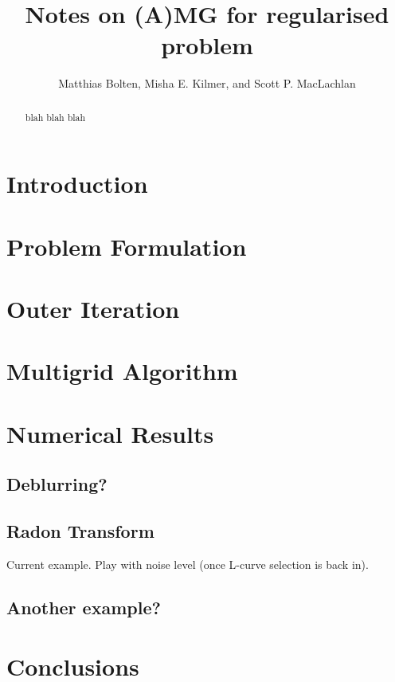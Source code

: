 \documentclass{article}
\title{Notes on (A)MG for regularised problem}
\author{Matthias Bolten, Misha E. Kilmer, and Scott P. MacLachlan}
\begin{document}
\maketitle

\begin{abstract}
blah blah blah
\end{abstract}


\section{Introduction}


\section{Problem Formulation}


\section{Outer Iteration}


\section{Multigrid Algorithm}



\section{Numerical Results}

\subsection{Deblurring?}

\subsection{Radon Transform}

Current example.  Play with noise level (once L-curve selection is
back in).

\subsection{Another example?}

\section{Conclusions}

 
\end{document}
